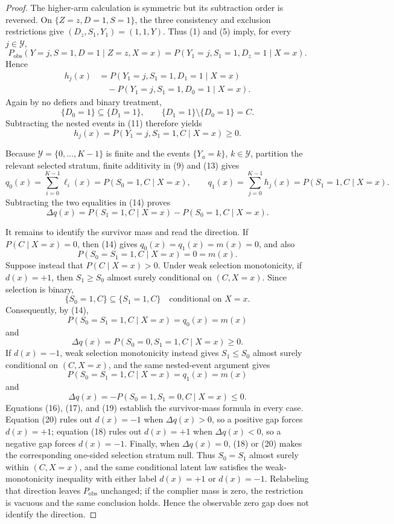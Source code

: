 \documentclass{article}
\begin{document}
\begin{proof}
The higher-arm calculation is symmetric but its subtraction order is reversed.  On \(\{Z=z,D=1,S=1\}\), the three consistency and exclusion restrictions give \((D_z,S_1,Y_1)=(1,1,Y)\).  Thus (1) and (5) imply, for every \(j\in\mathcal Y\),
\[
P_{\mathrm{obs}}(Y=j,S=1,D=1\mid Z=z,X=x)
=P(Y_1=j,S_1=1,D_z=1\mid X=x).
\tag{10}
\]
Hence
\[
\begin{aligned}
h_j(x)
&=P(Y_1=j,S_1=1,D_1=1\mid X=x)\\
&\quad-P(Y_1=j,S_1=1,D_0=1\mid X=x).
\end{aligned}
\tag{11}
\]
Again by no defiers and binary treatment,
\[
\{D_0=1\}\subseteq\{D_1=1\},
\qquad
\{D_1=1\}\setminus\{D_0=1\}=C.
\tag{12}
\]
Subtracting the nested events in (11) therefore yields
\[
h_j(x)=P(Y_1=j,S_1=1,C\mid X=x)\ge0.
\tag{13}
\]

Because \(\mathcal Y=\{0,\ldots,K-1\}\) is finite and the events \(\{Y_a=k\}\), \(k\in\mathcal Y\), partition the relevant selected stratum, finite additivity in (9) and (13) gives
\[
q_0(x)=\sum_{i=0}^{K-1}\ell_i(x)=P(S_0=1,C\mid X=x),
\qquad
q_1(x)=\sum_{j=0}^{K-1}h_j(x)=P(S_1=1,C\mid X=x).
\tag{14}
\]
Subtracting the two equalities in (14) proves
\[
\Delta q(x)
=P(S_1=1,C\mid X=x)-P(S_0=1,C\mid X=x).
\tag{15}
\]

It remains to identify the survivor mass and read the direction.  If \(P(C\mid X=x)=0\), then (14) gives \(q_0(x)=q_1(x)=m(x)=0\), and also
\[
P(S_0=S_1=1,C\mid X=x)=0=m(x).
\tag{16}
\]
Suppose instead that \(P(C\mid X=x)>0\).  Under weak selection monotonicity, if \(d(x)=+1\), then \(S_1\ge S_0\) almost surely conditional on \((C,X=x)\).  Since selection is binary,
\[
\{S_0=1,C\}\subseteq\{S_1=1,C\}\quad\text{conditional on }X=x.
\]
Consequently, by (14),
\[
P(S_0=S_1=1,C\mid X=x)=q_0(x)=m(x)
\tag{17}
\]
and
\[
\Delta q(x)=P(S_0=0,S_1=1,C\mid X=x)\ge0.
\tag{18}
\]
If \(d(x)=-1\), weak selection monotonicity instead gives \(S_1\le S_0\) almost surely conditional on \((C,X=x)\), and the same nested-event argument gives
\[
P(S_0=S_1=1,C\mid X=x)=q_1(x)=m(x)
\tag{19}
\]
and
\[
\Delta q(x)=-P(S_0=1,S_1=0,C\mid X=x)\le0.
\tag{20}
\]
Equations (16), (17), and (19) establish the survivor-mass formula in every case.  Equation (20) rules out \(d(x)=-1\) when \(\Delta q(x)>0\), so a positive gap forces \(d(x)=+1\); equation (18) rules out \(d(x)=+1\) when \(\Delta q(x)<0\), so a negative gap forces \(d(x)=-1\).  Finally, when \(\Delta q(x)=0\), (18) or (20) makes the corresponding one-sided selection stratum null.  Thus \(S_0=S_1\) almost surely within \((C,X=x)\), and the same conditional latent law satisfies the weak-monotonicity inequality with either label \(d(x)=+1\) or \(d(x)=-1\).  Relabeling that direction leaves \(P_{\mathrm{obs}}\) unchanged; if the complier mass is zero, the restriction is vacuous and the same conclusion holds.  Hence the observable zero gap does not identify the direction.
\end{proof}
\end{document}
